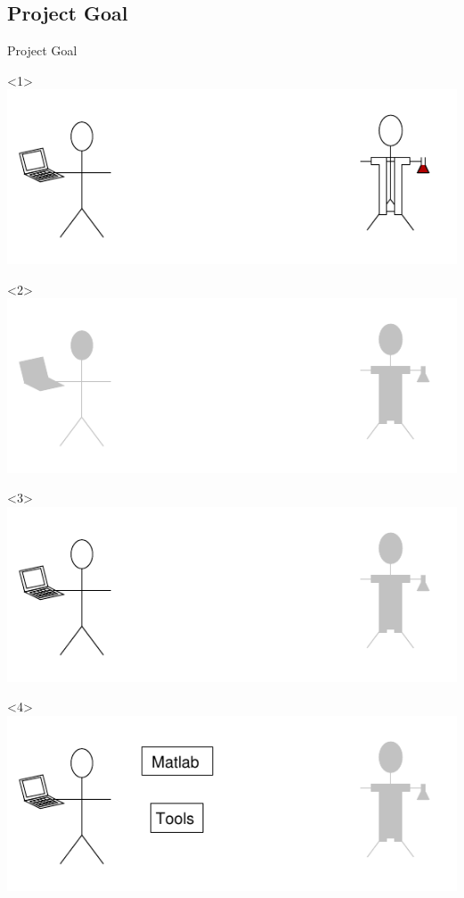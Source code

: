 \subsection{Project Goal}
\begin{frame}{Project Goal}
    \begin{onlyenv}<1>
      \includegraphics{images/perspectives1.pdf}
    \end{onlyenv}
    \begin{onlyenv}<2>
      \includegraphics{images/perspectives_grey.pdf}
    \end{onlyenv}
    \begin{onlyenv}<3>
      \includegraphics{images/perspectives2_comp.pdf}
    \end{onlyenv}
    \begin{onlyenv}<4>
      \includegraphics{images/perspectives3_comp.pdf}

\end{onlyenv}
\end{frame}
